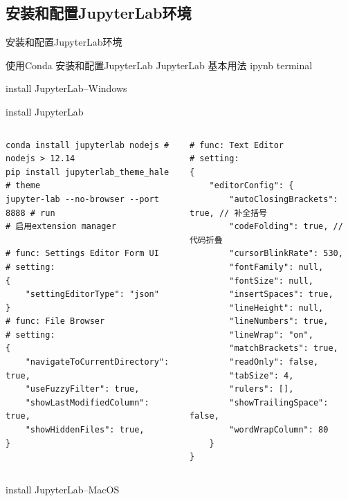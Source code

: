 \subsection{安装和配置JupyterLab环境}

\begin{frame}[standout]{安装和配置JupyterLab环境}
    \begin{myoutline}
        \1 使用Conda 安装和配置JupyterLab
            \2 
        \1 JupyterLab 基本用法
            \2 ipynb
            \2 terminal
    \end{myoutline}
\end{frame}

\begin{frame}[standout]install JupyterLab--Windows\end{frame}

\begin{frame}[fragile]{install JupyterLab}
    \begin{columns}
        \begin{lstlisting}
conda install jupyterlab nodejs # nodejs > 12.14
pip install jupyterlab_theme_hale # theme
jupyter-lab --no-browser --port 8888 # run
# 启用extension manager

# func: Settings Editor Form UI
# setting:
{
    "settingEditorType": "json"
}
# func: File Browser
# setting: 
{
    "navigateToCurrentDirectory": true,
    "useFuzzyFilter": true,
    "showLastModifiedColumn": true,
    "showHiddenFiles": true,
}
        \end{lstlisting}
        \begin{lstlisting}
# func: Text Editor
# setting:
{
    "editorConfig": {
        "autoClosingBrackets": true, // 补全括号
        "codeFolding": true, // 代码折叠
        "cursorBlinkRate": 530,
        "fontFamily": null,
        "fontSize": null,
        "insertSpaces": true,
        "lineHeight": null,
        "lineNumbers": true,
        "lineWrap": "on",
        "matchBrackets": true,
        "readOnly": false,
        "tabSize": 4,
        "rulers": [],
        "showTrailingSpace": false,
        "wordWrapColumn": 80
    }
}
        \end{lstlisting}
    \end{columns}
\end{frame}

\begin{frame}[standout]install JupyterLab--MacOS\end{frame}

